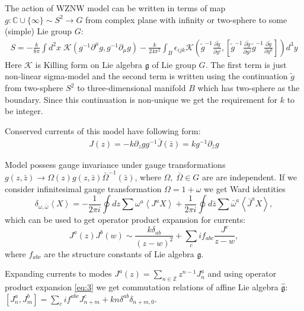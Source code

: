 \documentclass[a4paper]{jpconf}
\theoremstyle{definition}
\newcommand{\gf}{\mathfrak{g}}
\newcommand{\gfh}{\hat{\mathfrak{g}}}
\theoremstyle{definition} \newtheorem{Def}{Definition}
\begin{document}
 The action of WZNW model can be written in terms of map $g:\mathbb{C}\cup \{\infty\}\sim S^{2}\to G$ from complex plane with infinity or two-sphere to some (simple) Lie group $G$:
\begin{multline}
  S=-\frac{k}{8\pi}\int d^2x\; \mathcal{K} (g^{-1}\partial^{\mu}g, g^{-1} \partial_{\mu}g)  
  - \frac{k }{24\pi^{2}} \int_{B}\epsilon_{ijk} \mathcal{K}\left(
    \tilde g^{-1}\frac{\partial \tilde g}{\partial y^i},\left[
      \tilde g^{-1}\frac{\partial \tilde g}{\partial y^j}
      \tilde g^{-1}\frac{\partial \tilde g}{\partial y^k}\right]\right) d^3y
\end{multline}
 Here $\mathcal{K}$ is Killing form on Lie algebra $\gf$ of Lie group $G$. The first term is just non-linear sigma-model and the second term is written using the continuation $\tilde{g}$ from two-sphere $S^{2}$ to three-dimensional manifold $B$ which has two-sphere as the boundary. Since this continuation is non-unique we get the requirement for $k$ to be integer. 

Conserved currents of this model have following form:
  \begin{eqnarray}
    J(z)= -k \partial_zg g^{-1}
    \bar J(\bar z)=k g^{-1}\partial_{\bar z}g
  \end{eqnarray}

Model possess gauge invariance under gauge transformations
  $g(z,\bar z)\to \Omega(z)g(z,\bar z)\bar \Omega^{-1}(\bar z)$, 
where $\Omega,\;\bar \Omega \in G$ are are independent. If we consider infinitesimal gauge transformation $\Omega=1+\omega$ we get Ward identities 
  \begin{equation}
    \label{eq:87}
    \delta_{\omega,\bar \omega}\left< X \right>=-\frac{1}{2\pi i}\oint dz \sum\omega^a \left< J^a X\right>+
    \frac{1}{2\pi i} \oint d\bar z \sum \bar \omega^a \left< \bar J^a X\right>,
  \end{equation}
which can be used to get operator product expansion for currents:
 \begin{equation}
   \label{eq:3}
   J^{a}(z)J^{b}(w)\sim \frac{k\delta_{ab}}{(z-w)^{2}}+\sum_{c}i f_{abc}\frac{J^{c}}{z-w},
 \end{equation}
where $f_{abc}$ are the structure constants of Lie algebra $\gf$.
 
Expanding currents to modes
$J^a(z)=\sum\limits_{n\in \mathbb Z}z^{n-1}J^a_n $
and using operator product expansion \eqref{eq:3} we get commutation relations of affine Lie algebra $\gfh$:
$ \left[J^a_n,J^b_m\right]=\sum_c i f^{abc}J^c_{n+m}+kn\delta^{ab}\delta_{n+m,0} $.
\end{document}
